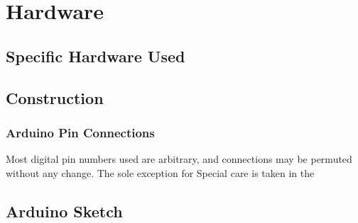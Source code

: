 \chapter{Hardware}

\section{Specific Hardware Used}







\section{Construction}

\subsection{Arduino Pin Connections}
Most digital pin numbers used are arbitrary, and connections may be permuted without any change. The sole exception  for Special care is taken in the 

\section{Arduino Sketch}
